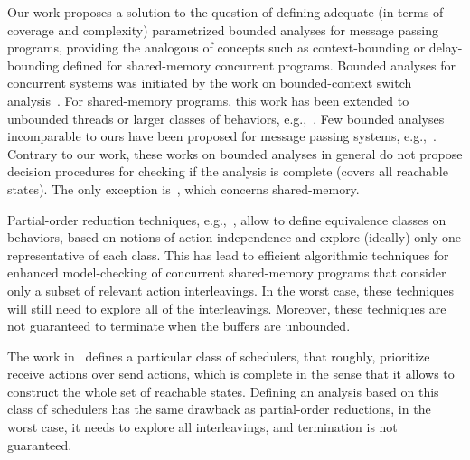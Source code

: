 Our work proposes a solution to the question of defining adequate (in terms of coverage and complexity) parametrized bounded analyses for message passing programs, providing the analogous of concepts such as context-bounding or delay-bounding defined for shared-memory concurrent programs. Bounded analyses for concurrent systems
was initiated by the work on bounded-context switch analysis~\cite{DBLP:conf/pldi/QadeerW04,DBLP:conf/tacas/QadeerR05,DBLP:conf/cav/LalR08}. For shared-memory programs, this work has been extended to unbounded threads or larger classes of behaviors, e.g.,~\cite{DBLP:conf/sas/BouajjaniEP11,DBLP:conf/popl/EmmiQR11,DBLP:conf/spin/KiddJV10,DBLP:conf/cav/TorreMP10}. Few bounded analyses incomparable to ours have been proposed for message passing systems, e.g.,~\cite{DBLP:conf/tacas/TorreMP08,DBLP:conf/tacas/BouajjaniE12}. Contrary to our work, these works on bounded analyses in general do not propose decision procedures for checking if the analysis is complete (covers all reachable states). The only exception is~\cite{DBLP:conf/cav/TorreMP10}, which concerns shared-memory.  

Partial-order reduction techniques, e.g.,~\cite{DBLP:conf/popl/AbdullaAJS14,DBLP:conf/popl/FlanaganG05}, allow to define equivalence classes on behaviors, based on notions of action independence and explore (ideally) only one representative of each class. This has lead to efficient algorithmic techniques for enhanced model-checking of concurrent shared-memory programs that consider only a subset of relevant action interleavings. In the worst case, these techniques will still need to explore all of the interleavings. Moreover, these techniques are not guaranteed to terminate when the buffers are unbounded.

The work in~\cite{DBLP:conf/oopsla/Desai0M14} defines a particular class of schedulers, that roughly, prioritize receive actions over send actions, which is complete in the sense that it allows to construct the whole set of reachable states. Defining an analysis based on this class of schedulers has the same drawback as partial-order reductions, in the worst case, it needs to explore all interleavings, and termination is not guaranteed. 


